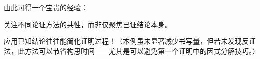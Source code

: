 由此可得一个宝贵的经验：

\begin{center}
    关注不同论证方法的共性，而非仅聚焦已证结论本身。
\end{center}

应用已知结论往往能简化证明过程！（本例虽未显著减少书写量，但若未发现反证法，此方法可以节省构思时间——尤其是可以避免第一个证明中的因式分解技巧。）